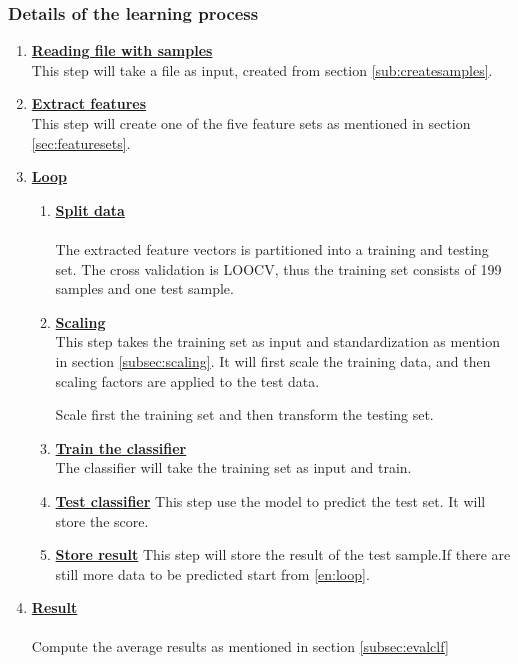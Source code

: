 \documentclass[USenglish]{ifimaster}  %
\begin{document}
\subsubsection{Details of the learning process}
\begin{enumerate}
\item \textbf{\underline{Reading file with samples}}
\\
This step will take a file as input, created from section \ref{sub:createsamples}.

\item \textbf{\underline{Extract features}}
\\
This step will create one of the five feature sets as mentioned in section \ref{sec:featuresets}.

\item \textbf{\underline{Loop}}

\begin{enumerate} 
\item \textbf{\underline{Split data}} \label{en:loop}
\\
\\
The extracted feature vectors is partitioned into a training and testing set. The cross validation is LOOCV, thus the training set consists of 199 samples and one test sample.


\item \textbf{\underline{Scaling}}
\\
This step takes the training set as input and standardization as mention in section \ref{subsec:scaling}. It will first scale the training data, and then scaling factors are applied to the test data.

Scale first the training set and then transform the testing set.
\item \textbf{\underline{Train the classifier}}
\\
The classifier will take the training set as input and train.

\item \textbf{\underline{Test classifier}} This step use the model to predict the test set. It will store the score.


\item \textbf{\underline{Store result}} This step will store the result of the test sample.If there are still more data to be predicted start from \ref{en:loop}.

\end{enumerate}


\item \textbf{\underline{Result}}
\\
\\
Compute the average results as mentioned in section \ref{subsec:evalclf} 
\end{enumerate}
\end{document}
